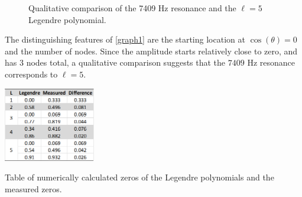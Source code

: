 \documentclass[12pt]{article}
\begin{document}
	\begin{figure}[H]
		\centering
		\qquad
		\caption{Qualitative comparison of the 7409 Hz resonance and the $\ell=5$ Legendre polynomial.}
		\label{comparison}
	\end{figure}

	
	The distinguishing features of \cref{graph1} are the starting location at $\cos(\theta) = 0$ and the number of nodes. Since the amplitude starts relatively close to zero, and has $3$ nodes total, a qualitative comparison suggests that the $7409$ Hz resonance corresponds to $\ell=5$.
	
	
	\begin{table}
		\centering
		\includegraphics[width=0.3\textwidth]{Tables/LegendreTable.png}
		\caption{Table of numerically calculated zeros of the Legendre polynomials and the measured zeros.}
		\label{legendreTable}
	\end{table}
	
\end{document}
